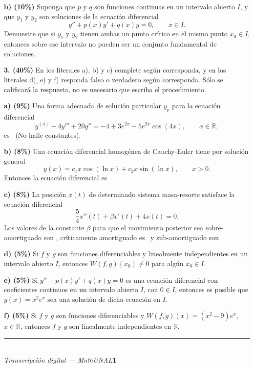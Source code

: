 \documentclass[11pt]{article}
\providecommand{\nota}[1]{\par\smallskip\noindent{\small\itshape\color{unalblue}#1}\par\smallskip}
\newcommand{\rp}{\underline{\hspace{3cm}}}
\begin{document}
\noindent\textbf{b) (10\%)} Suponga que $p$ y $q$ son funciones continuas en un intervalo abierto $I$, y que $y_1$ y $y_2$ son soluciones de la ecuación diferencial
\[
y''+p(x)y'+q(x)y=0, \qquad x\in I.
\]
Demuestre que si $y_1$ y $y_2$ tienen ambas un punto crítico en el mismo punto $x_0\in I$, entonces sobre ese intervalo no pueden ser un conjunto fundamental de soluciones.

\nota{Un punto crítico es donde $y_i'(x_0)=0$.}

\vspace{5cm}

\newpage

\noindent\textbf{3. (40\%)} En los literales a), b) y c) complete según corresponda, y en los literales d), e) y f) responda falso o verdadero según corresponda. Sólo se calificará la respuesta, no es necesario que escriba el procedimiento.

\vspace{0.25cm}
\noindent\textbf{a) (9\%)} Una forma adecuada de solución particular $y_p$ para la ecuación diferencial
\[
y^{(4)}-4y'''+20y''=-4+3e^{2x}-5e^{2x}\cos(4x), \qquad x\in\mathbb{R},
\]
es \rp\ (No halle constantes).

\vspace{0.25cm}
\noindent\textbf{b) (8\%)} Una ecuación diferencial homogénea de Cauchy-Euler tiene por solución general
\[
y(x)=c_1x\cos(\ln x)+c_2x\sin(\ln x), \qquad x>0.
\]
Entonces la ecuación diferencial es \rp

\vspace{0.25cm}
\noindent\textbf{c) (8\%)} La posición $x(t)$ de determinado sistema masa-resorte satisface la ecuación diferencial
\[
\frac{5}{4}x''(t)+\beta x'(t)+4x(t)=0.
\]
Los valores de la constante $\beta$ para que el movimiento posterior sea sobre-amortiguado son \rp, críticamente amortiguado es \rp\ y sub-amortiguado son \rp

\vspace{0.3cm}
\noindent\textbf{d) (5\%)} Si $f$ y $g$ son funciones diferenciables y linealmente independientes en un intervalo abierto $I$, entonces $W(f,g)(x_0)\neq 0$ para algún $x_0\in I$.

\rp

\vspace{0.3cm}
\noindent\textbf{e) (5\%)} Si $y''+p(x)y'+q(x)y=0$ es una ecuación diferencial con coeficientes continuos en un intervalo abierto $I$, con $0\in I$, entonces es posible que $y(x)=x^2e^x$ sea una solución de dicha ecuación en $I$.

\rp

\vspace{0.3cm}
\noindent\textbf{f) (5\%)} Si $f$ y $g$ son funciones diferenciables y $W(f,g)(x)=(x^2-9)e^x$, $x\in\mathbb{R}$, entonces $f$ y $g$ son linealmente independientes en $\mathbb{R}$.

\rp

\vfill
\rule{\linewidth}{0.4pt}\\[1pt]
{\scriptsize\textit{Transcripción digital --- MathUNAL}\hfill\textcolor{unalblue}{\textbf{1}}}
\end{document}
